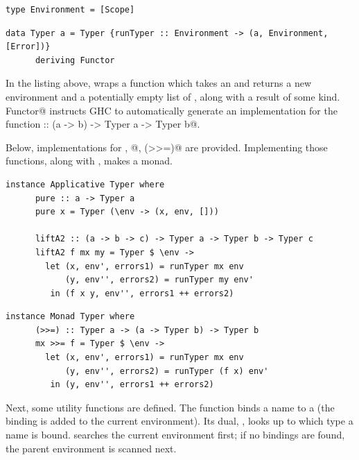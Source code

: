 \documentclass[UdineBachThesis,american,11pt,draft]{PhdThesis}
\begin{document}
  \begin{lstlisting}[gobble=4,basicstyle=\ttfamily\small]
    type Environment = [Scope]
  \end{lstlisting}

  \begin{lstlisting}[gobble=4,basicstyle=\ttfamily\small]
    data Typer a = Typer {runTyper :: Environment -> (a, Environment, [Error])}
      deriving Functor
  \end{lstlisting}

  In the listing above, \lstinline@Typer@ wraps a function which takes an
  \lstinline@Environment@ and returns a new environment and a potentially empty
  list of \lstinline@Error@s, along with a result of some kind.
  \lstinline@deriving Functor@ instructs GHC to automatically generate an
  implementation for the function
  \lstinline@fmap :: (a -> b) -> Typer a -> Typer b@.

  Below, implementations for \lstinline@pure@, @,
  \lstinline@(>>=)@ are provided. Implementing those functions, along with
  \lstinline@fmap@, makes \lstinline@Typer@ a monad.

  \begin{lstlisting}[gobble=4,basicstyle=\ttfamily\small]
    instance Applicative Typer where
      pure :: a -> Typer a
      pure x = Typer (\env -> (x, env, []))

      liftA2 :: (a -> b -> c) -> Typer a -> Typer b -> Typer c
      liftA2 f mx my = Typer $ \env ->
        let (x, env', errors1) = runTyper mx env
            (y, env'', errors2) = runTyper my env'
         in (f x y, env'', errors1 ++ errors2)
  \end{lstlisting}

  \begin{lstlisting}[gobble=4,basicstyle=\ttfamily\small]
    instance Monad Typer where
      (>>=) :: Typer a -> (a -> Typer b) -> Typer b
      mx >>= f = Typer $ \env ->
        let (x, env', errors1) = runTyper mx env
            (y, env'', errors2) = runTyper (f x) env'
         in (y, env'', errors1 ++ errors2)
  \end{lstlisting}

  Next, some utility functions are defined. The function \lstinline@defineType@
  binds a name to a \lstinline@Type@ (the binding is added to the current
  environment). Its dual, \lstinline@lookupType@, looks up to which type a name
  is bound. \lstinline@lookupType@ searches the current environment first; if no
  bindings are found, the parent environment is scanned next.
\end{document}
